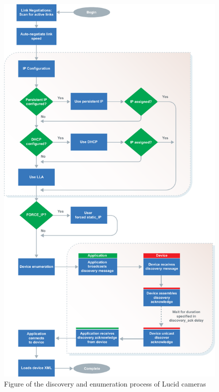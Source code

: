\begin{figure}[H]
    \centering
    \includegraphics[height=\textheight]{figures/PDF/lucid_ip_discovery.pdf}
    \caption{Figure of the discovery and enumeration process of Lucid cameras \cite{lucidvisionlabsTritonMPPolarized2020}}
    \label{fig:lucid_ip_discovery}
\end{figure}


